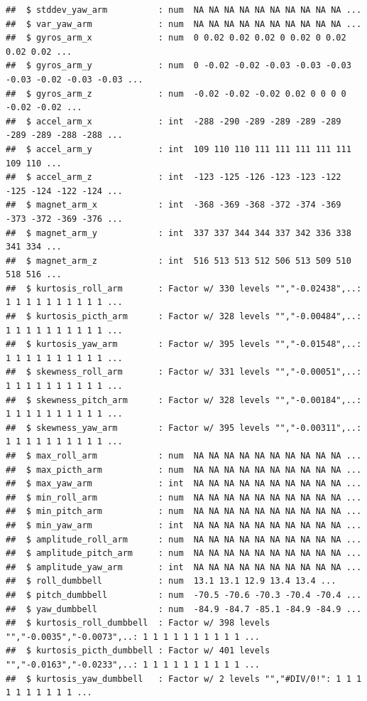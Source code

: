 \documentclass[]{article}
\begin{document}
\begin{verbatim}
##  $ stddev_yaw_arm          : num  NA NA NA NA NA NA NA NA NA NA ...
##  $ var_yaw_arm             : num  NA NA NA NA NA NA NA NA NA NA ...
##  $ gyros_arm_x             : num  0 0.02 0.02 0.02 0 0.02 0 0.02 0.02 0.02 ...
##  $ gyros_arm_y             : num  0 -0.02 -0.02 -0.03 -0.03 -0.03 -0.03 -0.02 -0.03 -0.03 ...
##  $ gyros_arm_z             : num  -0.02 -0.02 -0.02 0.02 0 0 0 0 -0.02 -0.02 ...
##  $ accel_arm_x             : int  -288 -290 -289 -289 -289 -289 -289 -289 -288 -288 ...
##  $ accel_arm_y             : int  109 110 110 111 111 111 111 111 109 110 ...
##  $ accel_arm_z             : int  -123 -125 -126 -123 -123 -122 -125 -124 -122 -124 ...
##  $ magnet_arm_x            : int  -368 -369 -368 -372 -374 -369 -373 -372 -369 -376 ...
##  $ magnet_arm_y            : int  337 337 344 344 337 342 336 338 341 334 ...
##  $ magnet_arm_z            : int  516 513 513 512 506 513 509 510 518 516 ...
##  $ kurtosis_roll_arm       : Factor w/ 330 levels "","-0.02438",..: 1 1 1 1 1 1 1 1 1 1 ...
##  $ kurtosis_picth_arm      : Factor w/ 328 levels "","-0.00484",..: 1 1 1 1 1 1 1 1 1 1 ...
##  $ kurtosis_yaw_arm        : Factor w/ 395 levels "","-0.01548",..: 1 1 1 1 1 1 1 1 1 1 ...
##  $ skewness_roll_arm       : Factor w/ 331 levels "","-0.00051",..: 1 1 1 1 1 1 1 1 1 1 ...
##  $ skewness_pitch_arm      : Factor w/ 328 levels "","-0.00184",..: 1 1 1 1 1 1 1 1 1 1 ...
##  $ skewness_yaw_arm        : Factor w/ 395 levels "","-0.00311",..: 1 1 1 1 1 1 1 1 1 1 ...
##  $ max_roll_arm            : num  NA NA NA NA NA NA NA NA NA NA ...
##  $ max_picth_arm           : num  NA NA NA NA NA NA NA NA NA NA ...
##  $ max_yaw_arm             : int  NA NA NA NA NA NA NA NA NA NA ...
##  $ min_roll_arm            : num  NA NA NA NA NA NA NA NA NA NA ...
##  $ min_pitch_arm           : num  NA NA NA NA NA NA NA NA NA NA ...
##  $ min_yaw_arm             : int  NA NA NA NA NA NA NA NA NA NA ...
##  $ amplitude_roll_arm      : num  NA NA NA NA NA NA NA NA NA NA ...
##  $ amplitude_pitch_arm     : num  NA NA NA NA NA NA NA NA NA NA ...
##  $ amplitude_yaw_arm       : int  NA NA NA NA NA NA NA NA NA NA ...
##  $ roll_dumbbell           : num  13.1 13.1 12.9 13.4 13.4 ...
##  $ pitch_dumbbell          : num  -70.5 -70.6 -70.3 -70.4 -70.4 ...
##  $ yaw_dumbbell            : num  -84.9 -84.7 -85.1 -84.9 -84.9 ...
##  $ kurtosis_roll_dumbbell  : Factor w/ 398 levels "","-0.0035","-0.0073",..: 1 1 1 1 1 1 1 1 1 1 ...
##  $ kurtosis_picth_dumbbell : Factor w/ 401 levels "","-0.0163","-0.0233",..: 1 1 1 1 1 1 1 1 1 1 ...
##  $ kurtosis_yaw_dumbbell   : Factor w/ 2 levels "","#DIV/0!": 1 1 1 1 1 1 1 1 1 1 ...

\end{verbatim}
\end{document}
